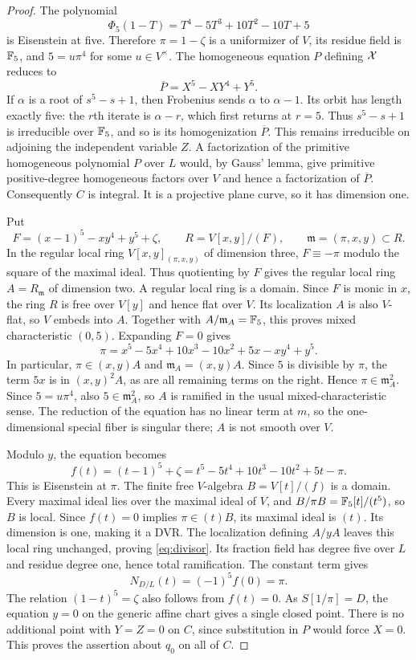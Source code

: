 \begin{proof}
The polynomial
\[
 \Phi_5(1-T)=T^4-5T^3+10T^2-10T+5
\]
is Eisenstein at five. Therefore $\pi=1-\zeta$ is a uniformizer
of $V$, its residue field is $\mathbb F_5$, and $5=u\pi^4$ for some
$u\in V^\times$.
The homogeneous equation $P$ defining $\mathcal X$ reduces to
\[
 \overline P=X^5-XY^4+Y^5.
\]
If $\alpha$ is a root of $s^5-s+1$, then Frobenius sends
$\alpha$ to $\alpha-1$. Its orbit has length exactly five:
the $r$th iterate is $\alpha-r$, which first returns at $r=5$.
Thus $s^5-s+1$ is irreducible over $\mathbb F_5$, and so is its
homogenization $\overline P$. This remains irreducible on adjoining
the independent variable $Z$. A factorization of the primitive
homogeneous polynomial $P$ over $L$ would, by Gauss' lemma, give
primitive positive-degree homogeneous factors over $V$ and hence
a factorization of $\overline P$. Consequently $C$ is integral.
It is a projective plane curve, so it has dimension one.

Put
\[
 F=(x-1)^5-xy^4+y^5+\zeta,\qquad
 R=V[x,y]/(F),\qquad \mathfrak m=(\pi,x,y)\subset R.
\]
In the regular local ring $V[x,y]_{(\pi,x,y)}$ of dimension
three, $F\equiv-\pi$ modulo the square of the maximal ideal.
Thus quotienting by $F$ gives the regular local ring
$A=R_{\mathfrak m}$ of dimension two. A regular local ring is
a domain. Since $F$ is monic in $x$, the ring $R$ is free over
$V[y]$ and hence flat over $V$. Its localization $A$ is also
$V$-flat, so $V$ embeds into $A$. Together with
$A/\mathfrak m_A=\mathbb F_5$, this proves mixed characteristic $(0,5)$.
Expanding $F=0$ gives
\[
 \pi=x^5-5x^4+10x^3-10x^2+5x-xy^4+y^5.
\]
In particular, $\pi\in(x,y)A$ and $\mathfrak m_A=(x,y)A$.
Since $5$ is divisible by $\pi$, the term $5x$ is in
$(x,y)^2A$, as are all remaining terms on the right. Hence
$\pi\in\mathfrak m_A^2$. Since $5=u\pi^4$, also
$5\in\mathfrak m_A^2$, so $A$ is ramified in the usual
mixed-characteristic sense. The reduction of the equation has
no linear term at $m$, so the one-dimensional special fiber is
singular there; $A$ is not smooth over $V$.

Modulo $y$, the equation becomes
\[
 f(t)=(t-1)^5+\zeta
 =t^5-5t^4+10t^3-10t^2+5t-\pi.
\]
This is Eisenstein at $\pi$. The finite free $V$-algebra
$B=V[t]/(f)$ is a domain. Every maximal ideal lies over the
maximal ideal of $V$, and
$B/\pi B=\mathbb F_5[t]/(t^5)$, so $B$ is local. Since $f(t)=0$
implies $\pi\in(t)B$, its maximal ideal is $(t)$.
Its dimension is one, making it a DVR. The localization defining
$A/yA$ leaves this local ring unchanged, proving
\eqref{eq:divisor}. Its fraction field has degree five over $L$
and residue degree one, hence total ramification. The constant
term gives
\[
 N_{D/L}(t)=(-1)^5f(0)=\pi.
\]
The relation $(1-t)^5=\zeta$ also follows from $f(t)=0$.
As $S[1/\pi]=D$, the equation $y=0$ on the generic affine
chart gives a single closed point. There is no additional point
with $Y=Z=0$ on $C$, since substitution in $P$ would force
$X=0$. This proves the assertion about $q_0$ on all of $C$.


\end{proof}
